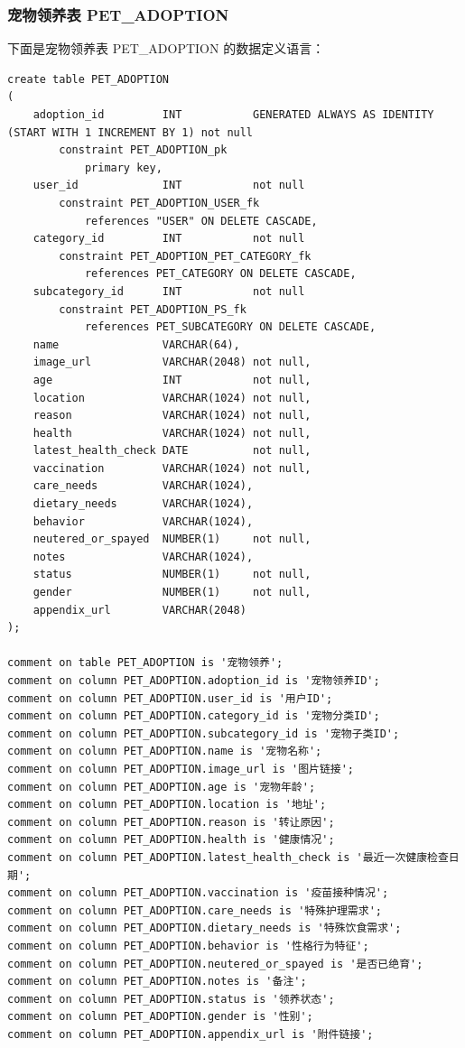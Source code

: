 \subsubsection{宠物领养表 PET\_ADOPTION}

下面是宠物领养表 PET\_ADOPTION 的数据定义语言：

\begin{verbatim}
create table PET_ADOPTION
(
    adoption_id         INT           GENERATED ALWAYS AS IDENTITY (START WITH 1 INCREMENT BY 1) not null
        constraint PET_ADOPTION_pk
            primary key,
    user_id             INT           not null
        constraint PET_ADOPTION_USER_fk
            references "USER" ON DELETE CASCADE,
    category_id         INT           not null
        constraint PET_ADOPTION_PET_CATEGORY_fk
            references PET_CATEGORY ON DELETE CASCADE,
    subcategory_id      INT           not null
        constraint PET_ADOPTION_PS_fk
            references PET_SUBCATEGORY ON DELETE CASCADE,
    name                VARCHAR(64),
    image_url           VARCHAR(2048) not null,
    age                 INT           not null,
    location            VARCHAR(1024) not null,
    reason              VARCHAR(1024) not null,
    health              VARCHAR(1024) not null,
    latest_health_check DATE          not null,
    vaccination         VARCHAR(1024) not null,
    care_needs          VARCHAR(1024),
    dietary_needs       VARCHAR(1024),
    behavior            VARCHAR(1024),
    neutered_or_spayed  NUMBER(1)     not null,
    notes               VARCHAR(1024),
    status              NUMBER(1)     not null,
    gender              NUMBER(1)     not null,
    appendix_url        VARCHAR(2048)
);

comment on table PET_ADOPTION is '宠物领养';
comment on column PET_ADOPTION.adoption_id is '宠物领养ID';
comment on column PET_ADOPTION.user_id is '用户ID';
comment on column PET_ADOPTION.category_id is '宠物分类ID';
comment on column PET_ADOPTION.subcategory_id is '宠物子类ID';
comment on column PET_ADOPTION.name is '宠物名称';
comment on column PET_ADOPTION.image_url is '图片链接';
comment on column PET_ADOPTION.age is '宠物年龄';
comment on column PET_ADOPTION.location is '地址';
comment on column PET_ADOPTION.reason is '转让原因';
comment on column PET_ADOPTION.health is '健康情况';
comment on column PET_ADOPTION.latest_health_check is '最近一次健康检查日期';
comment on column PET_ADOPTION.vaccination is '疫苗接种情况';
comment on column PET_ADOPTION.care_needs is '特殊护理需求';
comment on column PET_ADOPTION.dietary_needs is '特殊饮食需求';
comment on column PET_ADOPTION.behavior is '性格行为特征';
comment on column PET_ADOPTION.neutered_or_spayed is '是否已绝育';
comment on column PET_ADOPTION.notes is '备注';
comment on column PET_ADOPTION.status is '领养状态';
comment on column PET_ADOPTION.gender is '性别';
comment on column PET_ADOPTION.appendix_url is '附件链接';
\end{verbatim}

